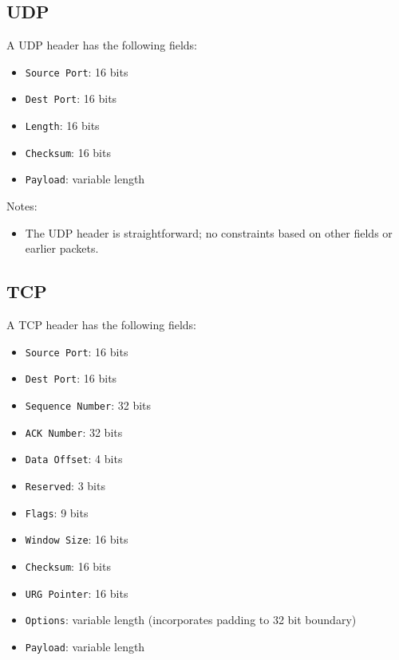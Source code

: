 \documentclass[10pt]{article}
\begin{document}
\subsection{UDP}

A UDP header has the following fields:
\begin{itemize}
\item \texttt{Source Port}: 16 bits
\item \texttt{Dest Port}: 16 bits
\item \texttt{Length}: 16 bits
\item \texttt{Checksum}: 16 bits
\item \texttt{Payload}: variable length
\end{itemize}

Notes:
\begin{itemize}
\item The UDP header is straightforward; no constraints based on other fields or earlier packets.
\end{itemize}

\subsection{TCP}

A TCP header has the following fields:
\begin{itemize}
\item \texttt{Source Port}: 16 bits
\item \texttt{Dest Port}: 16 bits
\item \texttt{Sequence Number}: 32 bits
\item \texttt{ACK Number}: 32 bits
\item \texttt{Data Offset}: 4 bits
\item \texttt{Reserved}: 3 bits
\item \texttt{Flags}: 9 bits
\item \texttt{Window Size}: 16 bits
\item \texttt{Checksum}: 16 bits
\item \texttt{URG Pointer}: 16 bits
\item \texttt{Options}: variable length (incorporates padding to 32 bit boundary)
\item \texttt{Payload}: variable length
\end{itemize}
\end{document}
